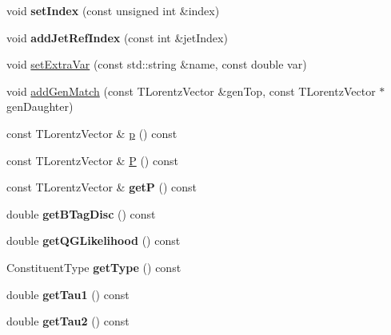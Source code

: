 \begin{DoxyCompactItemize}
\item 
\hypertarget{classConstituent_abc67caff918e263ec1e58372efa4641b}{void {\bfseries set\-Index} (const unsigned int \&index)}\label{classConstituent_abc67caff918e263ec1e58372efa4641b}

\item 
\hypertarget{classConstituent_a663d519cdaf8688be9f51152b9058c7e}{void {\bfseries add\-Jet\-Ref\-Index} (const int \&jet\-Index)}\label{classConstituent_a663d519cdaf8688be9f51152b9058c7e}

\item 
void \hyperlink{classConstituent_a1b2fc086bc359e141e54ed2903c951c9}{set\-Extra\-Var} (const std\-::string \&name, const double var)
\item 
void \hyperlink{classConstituent_a2aea6bdc5229bb87227bcc8caa9c51c6}{add\-Gen\-Match} (const T\-Lorentz\-Vector \&gen\-Top, const T\-Lorentz\-Vector $\ast$gen\-Daughter)
\item 
const T\-Lorentz\-Vector \& \hyperlink{classConstituent_a3f918f1210cc666288327544e32d728c}{p} () const 
\item 
const T\-Lorentz\-Vector \& \hyperlink{classConstituent_a9f95db0ef9ae97fa0dc2cf45153e4131}{P} () const 
\item 
\hypertarget{classConstituent_ac4954793667cf0b2ffd136fbd8df0cda}{const T\-Lorentz\-Vector \& {\bfseries get\-P} () const }\label{classConstituent_ac4954793667cf0b2ffd136fbd8df0cda}

\item 
\hypertarget{classConstituent_af2cbdf02c47682a97db91a724a4ae3e1}{double {\bfseries get\-B\-Tag\-Disc} () const }\label{classConstituent_af2cbdf02c47682a97db91a724a4ae3e1}

\item 
\hypertarget{classConstituent_ae58e807a0bd4adfff6c052882f2f9396}{double {\bfseries get\-Q\-G\-Likelihood} () const }\label{classConstituent_ae58e807a0bd4adfff6c052882f2f9396}

\item 
\hypertarget{classConstituent_a325cb683912acb64e2fcbde14726f6a6}{Constituent\-Type {\bfseries get\-Type} () const }\label{classConstituent_a325cb683912acb64e2fcbde14726f6a6}

\item 
\hypertarget{classConstituent_a2c057eb66cfeed68e5bd58e1c5815e8b}{double {\bfseries get\-Tau1} () const }\label{classConstituent_a2c057eb66cfeed68e5bd58e1c5815e8b}

\item 
\hypertarget{classConstituent_aa43ea922dc8db06b1b28b8a66db0edac}{double {\bfseries get\-Tau2} () const }\label{classConstituent_aa43ea922dc8db06b1b28b8a66db0edac}


\end{DoxyCompactItemize}
